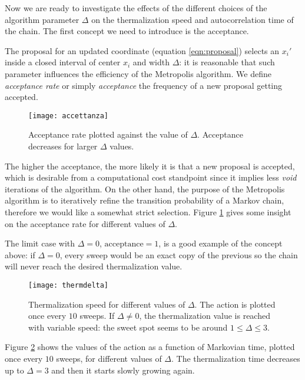 Now we are ready to investigate the effects of the different choices of the algorithm parameter $\Delta$ on the thermalization speed and autocorrelation time of the chain.
The first concept we need to introduce is the acceptance.

The proposal for an updated coordinate (equation \ref{eqn:proposal}) selects an $x_{i}'$ inside a closed interval of center
$x_{i}$ and width $\Delta$: it is reasonable that such parameter influences the efficiency of the Metropolis
algorithm. We define \textit{acceptance rate} or simply \textit{acceptance} the frequency of a new proposal getting accepted.

\begin{figure}[h!]
  \centering
 \texttt{[image: accettanza]}
  \caption{\label{fig:acceptance} Acceptance rate plotted against the value of $\Delta$. Acceptance decreases for larger $\Delta$ values. }
\end{figure}

The higher the acceptance, the more likely it is that a new proposal is accepted, which is desirable from a computational
cost standpoint since it implies less \textit{void} iterations of the algorithm. On the other hand, the purpose of the Metropolis algorithm
is to iteratively refine the transition probability of a Markov chain, therefore we would like a somewhat strict selection.
Figure \ref{fig:acceptance} gives some insight on the acceptance rate for different values of $\Delta$.

The limit case with $\Delta = 0$, $\text{acceptance}=1$, is a good example of the concept above: if $\Delta = 0$, every sweep would be an exact copy of the previous
so the chain will never reach the desired thermalization value.

\begin{figure}[ht]
  \centering
  \texttt{[image: thermdelta]}
  \caption{\label{fig:thermdelta}Thermalization speed for different values of $\Delta$. The action is plotted once every $10$ sweeps. If $\Delta \neq 0$, the thermalization value
  is reached with variable speed: the sweet spot seems to be around $1\le \Delta \le 3$.}
\end{figure}

Figure \ref{fig:thermdelta} shows the values of the action as a function of Markovian time, plotted once every $10$ sweeps, for different values
of $\Delta$. The thermalization time decreases up to $\Delta = 3$ and then it starts slowly growing again.


